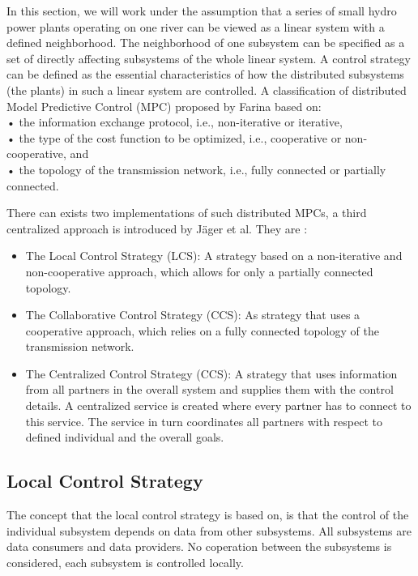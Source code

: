  In this section, we will work under the assumption that a series of small hydro power plants operating on one river can be viewed as a linear system with a defined neighborhood.\cite{farina2012distributed} The neighborhood of one subsystem can be specified as a set of directly affecting subsystems of the whole linear system.\cite{farina2012distributed} A control strategy can be defined as the essential characteristics of how the distributed subsystems (the plants) in such a linear system are controlled. A classification of distributed Model Predictive Control (MPC) proposed by Farina \cite{farina2012distributed} based on:\\
\indent • the information exchange protocol, i.e., non-iterative or iterative,\\
\indent • the type of the cost function to be optimized, i.e., cooperative or non-cooperative, and\\
\indent • the topology of the transmission network, i.e., fully connected or partially connected.

There can exists two implementations of such distributed MPCs, a third centralized approach is introduced by Jäger et al.\cite{SEIT2017} They are \cite{SEIT2017}:
\begin{itemize}
	\item The Local Control Strategy (LCS): A strategy based on a non-iterative and non-cooperative approach, which allows for only a partially connected topology.
	\item The Collaborative Control Strategy (CCS): As strategy that uses a cooperative approach, which relies on a fully connected topology of the transmission network.
	\item The Centralized Control Strategy (CCS): A strategy that uses information from all partners in the overall system and supplies them with the control details. A centralized service is created where every partner has to connect to this service. The service in turn coordinates all partners with respect to defined individual and the overall goals.
\end{itemize}
\subsection{Local Control Strategy}
The concept that the local control strategy is based on, is that the control of the individual subsystem depends on data from other subsystems. All subsystems are data consumers and data providers\cite{SEIT2017}. No coperation between the subsystems is considered, each subsystem is controlled locally. 

